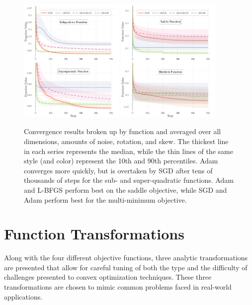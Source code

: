 \documentclass[letterpaper, 10 pt, conference]{IEEEtran}  %
\begin{document}
\begin{figure}
  \centering
  \includegraphics[width=0.45\textwidth]{Figures/final-function-1}
  \includegraphics[width=0.45\textwidth]{Figures/final-function-2}
  \caption{Convergence results broken up by function and averaged over
    all dimensions, amounts of noise, rotation, and skew. The thickest
    line in each series represents the median, while the thin lines of
    the same style (and color) represent the 10th and 90th
    percentiles. Adam converges more quickly, but is overtaken by SGD
    after tens of thousands of steps for the sub- and super-quadratic
    functions. Adam and L-BFGS perform best on the saddle objective,
    while SGD and Adam perform best for the multi-minimum objective.}
  \label{fig:results-function}
\end{figure}

\section{Function Transformations}

Along with the four different objective functions, three analytic
transformations are presented that allow for careful tuning of both
the type and the difficulty of challenges presented to convex
optimization techniques. These three transformations are chosen to
mimic common problems faced in real-world applications.
\end{document}
